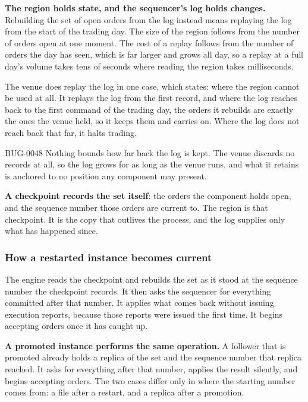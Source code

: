 \textbf{The region holds state, and the sequencer's log holds changes.}
Rebuilding the set of open orders from the log instead means replaying the log
from the start of the trading day. The size of the region follows from the number
of orders open at one moment. The cost of a replay follows from the number of
orders the day has seen, which is far larger and grows all day, so a replay at a
full day's volume takes tens of seconds where reading the region takes
milliseconds.

The venue does replay the log in one case, which  states: where
the region cannot be used at all. It replays the log from the first record, and
where the log reaches back to the first command of the trading day, the orders it
rebuilds are exactly the ones the venue held, so it keeps them and carries on.
Where the log does not reach back that far, it halts trading.

\begin{gap}{BUG-0048}
  Nothing bounds how far back the log is kept. The venue discards no records at
  all, so the log grows for as long as the venue runs, and what it retains is
  anchored to no position any component may present.
\end{gap}

\textbf{A checkpoint records the set itself}: the orders the component holds
open, and the sequence number those orders are current to. The region is that
checkpoint. It is the copy that outlives the process, and the log supplies only
what has happened since.

\subsubsection{How a restarted instance becomes current}
\label{sec:ha:disabled:me:recovery}

The engine reads the checkpoint and rebuilds the set as it stood at the sequence
number the checkpoint records. It then asks the sequencer for everything
committed after that number. It applies what comes back without issuing execution
reports, because those reports were issued the first time. It begins accepting
orders once it has caught up.

\textbf{A promoted instance performs the same operation.} A follower that is
promoted already holds a replica of the set and the sequence number that replica
reached. It asks for everything after that number, applies the result silently,
and begins accepting orders. The two cases differ only in where the starting
number comes from: a file after a restart, and a replica after a promotion.

